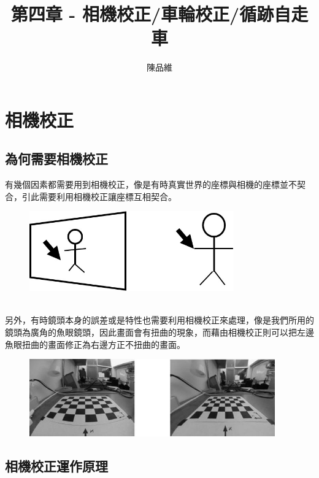 \documentclass{article}
\title{第四章 - 相機校正/車輪校正/循跡自走車}
\author{陳品維}
\date{} %
\begin{document}
\maketitle

\section{相機校正}
\subsection{為何需要相機校正}

有幾個因素都需要用到相機校正，像是有時真實世界的座標與相機的座標並不契合，引此需要利用相機校正讓座標互相契合。
\\
\begin{figure}[htp]
    \begin{center}
        \includegraphics[width=250pt]{pic/圖片1.jpg}
    \end{center}
\end{figure}
\\另外，有時鏡頭本身的誤差或是特性也需要利用相機校正來處理，像是我們所用的鏡頭為廣角的魚眼鏡頭，因此畫面會有扭曲的現象，而藉由相機校正則可以把左邊魚眼扭曲的畫面修正為右邊方正不扭曲的畫面。
\\
\begin{figure}[htp]
    \begin{center}
        \includegraphics[width=300pt]{pic/圖片2.jpg}
    \end{center}
\end{figure}

\subsection{相機校正運作原理}
\end{document}
